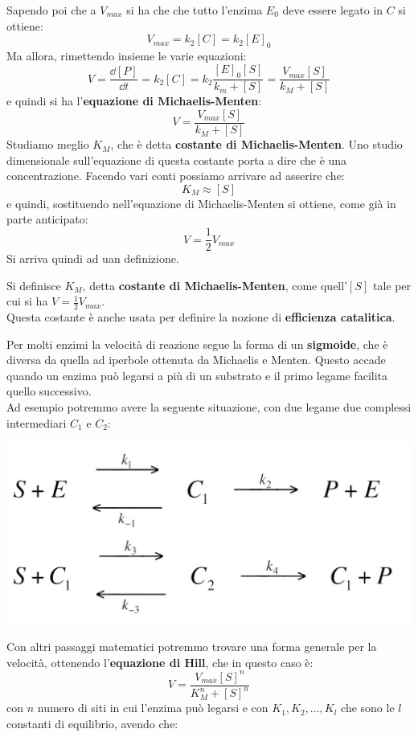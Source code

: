 \documentclass[a4paper,12pt, oneside]{book}
\begin{document}
Sapendo poi che a $V_{max}$ si ha che che tutto l'enzima $E_0$ deve essere
legato in $C$ si ottiene:
\[V_{max}=k_2[C]=k_2[E]_0\]
Ma allora, rimettendo insieme le varie equazioni:
\[V=\frac{\dd{[P]}}{\dd{t}}=k_2[C]=k_2\frac{[E]_0[S]}{k_m+[S]}=
  \frac{V_{max}[S]}{k_M+[S]}\]
e quindi si ha l'\textbf{equazione di Michaelis-Menten}:
\[V= \frac{V_{max}[S]}{k_M+[S]}\]
Studiamo meglio $K_M$, che è detta \textbf{costante di Michaelis-Menten}. Uno
studio dimensionale sull'equazione di questa costante porta a dire che è una
concentrazione. Facendo vari conti possiamo arrivare ad asserire che:
\[K_M\approx [S]\]
e quindi, sostituendo nell'equazione di Michaelis-Menten si ottiene, come già in
parte anticipato:
\[V=\frac{1}{2}V_{max}\]
Si arriva quindi ad uan definizione.
\begin{definizione}
  Si definisce $K_M$, detta \textbf{costante di Michaelis-Menten}, come
  quell'$[S]$ tale per cui si ha $V=\frac{1}{2}V_{max}$.\\
  Questa costante è anche usata per definire la nozione di \textbf{efficienza
    catalitica}. 
\end{definizione}
Per molti enzimi la velocità di reazione segue la forma di un \textbf{sigmoide},
che è diversa da quella ad iperbole ottenuta da Michaelis e Menten. Questo
accade quando un enzima può legarsi a più di un substrato e il primo legame
facilita quello successivo. \\
Ad esempio potremmo avere la seguente situazione, con due legame due complessi
intermediari $C_1$ e $C_2$:
\begin{center}
  \includegraphics[scale = 0.12]{img/equ4.jpg}
\end{center}
Con altri passaggi matematici potremmo trovare una forma generale per la
velocità, ottenendo l'\textbf{equazione di Hill}, che in questo caso è:
\[V= \frac{V_{max}[S]^n}{K_M^n+[S]^n}\]
con $n$ numero di siti in cui l'enzima può legarsi e con $K_1, K_2, \ldots, K_l$
che sono le $l$ constanti di equilibrio, avendo che:
\end{document}
